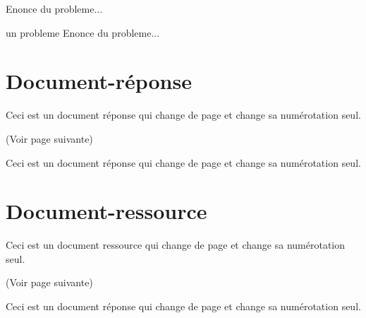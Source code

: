 \documentclass[a4paper,12pt]{article}
\begin{document}
\begin{code}%
Enonce du probleme...
\end{code}

\begin{exercice}{un probleme}
Enonce du probleme...
\end{exercice}





\section{Document-réponse}


\begin{code}%
\begin{docReponse}
Ceci est un document réponse qui change
de page et change sa numérotation seul.
\end{docReponse}
\end{code}
(Voir page suivante)

\begin{docReponse}
Ceci est un document réponse qui change
de page et change sa numérotation seul.
\end{docReponse}


\section{Document-ressource}


\begin{code}%
\begin{docRessource}
Ceci est un document ressource qui
change de page et change sa numérotation seul.
\end{docRessource}
\end{code}
(Voir page suivante)

\begin{docRessource}
Ceci est un document réponse qui
change de page et change sa numérotation seul.
\end{docRessource}
\end{document}
